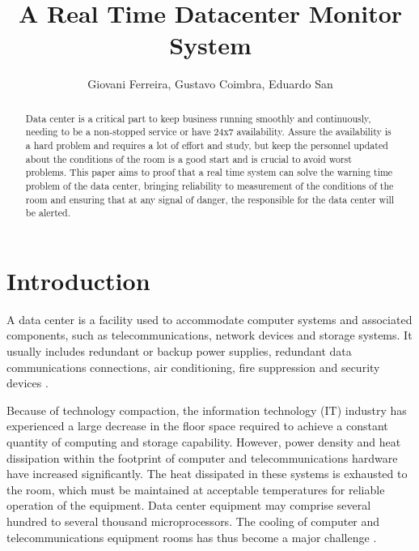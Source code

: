 \documentclass[12pt]{article}
\title{A Real Time Datacenter Monitor System}
\author{Giovani Ferreira\inst{1}, Gustavo Coimbra\inst{1}, Eduardo San\inst{1} }
\begin{document}
 

\maketitle

\begin{abstract}
Data center is a critical part to keep business running smoothly and continuously, needing to be a non-stopped service or 
have 24x7 availability. Assure the availability is a hard problem and requires a lot of effort and study, but keep the 
personnel updated about the conditions of the room is a good start and is crucial to avoid worst problems. This paper aims 
to proof that a real time system can solve the warning time problem of the data center, bringing reliability to measurement 
of the conditions of the room and ensuring that at any signal of danger, the responsible for the data center will be alerted.
\end{abstract}


\section{Introduction}

A data center is a facility used to accommodate computer systems and associated components, such as telecommunications, 
network devices and storage systems. It usually includes redundant or backup  power supplies, redundant data communications 
connections, air conditioning, fire suppression and security devices\cite{janpitak2011data} \cite{hassan2013temperature}. 

Because of technology compaction, the information technology (IT) industry has experienced a large decrease
in the floor space required to achieve a constant quantity of computing and storage capability. However, 
power density and heat dissipation within the footprint of computer and telecommunications hardware have 
increased significantly. The heat dissipated in these systems is exhausted to the room, which must be
maintained at acceptable temperatures for reliable operation of the equipment. Data center equipment may 
comprise several hundred to several thousand microprocessors. The cooling of computer and telecommunications 
equipment rooms has thus become a major challenge \cite{schmidt2005challenges}.
\end{document}
